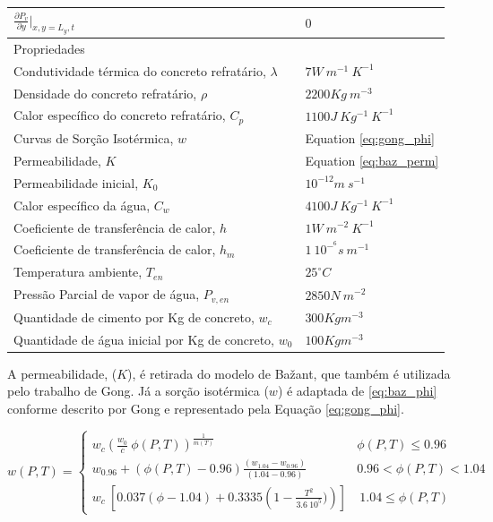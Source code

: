 \begin{table}[]
\begin{tabular}{|ll|}
$\frac{\partial P_v}{\partial y}\bigg\rvert_{x, y=L_y, t}$   & $0$                          \\ \hline
\multicolumn{2}{|l|}{Propriedades}                                                          \\ \hline
Condutividade térmica do concreto refratário, $\lambda$      & $7 W \ m^{-1} \ K^{-1}$      \\
Densidade do concreto refratário, $\rho$                     & $2200 Kg \ m^{-3}$           \\
Calor específico do concreto refratário, $C_p$               & $1100 J \ Kg^{-1} \ K^{-1}$  \\
Curvas de Sorção Isotérmica, $w$                             & Equation \ref{eq:gong_phi}           \\
Permeabilidade, $K$                                          & Equation \ref{eq:baz_perm}           \\
Permeabilidade inicial, $K_0$                                & $ 10^{-12} m \ s^{-1}$       \\
Calor específico da água, $C_w$                              & $ 4100 J \ Kg^{-1} \ K^{-1}$ \\
Coeficiente de transferência de calor, $h$                   & $ 1 W \ m^{-2} \ K^{-1}$     \\
Coeficiente de transferência de calor, $h_m$                 & $ 1 \ 10^{-^6} s \ m^{-1}$   \\
Temperatura ambiente, $T_{en}$                               & $ 25 ^{\circ}C$              \\
Pressão Parcial de vapor de água, $P_{v, en}$                & $ 2850 N \ m^{-2} $          \\
Quantidade de cimento por Kg de concreto, $w_c$              & $ 300 Kg m^{-3} $            \\
Quantidade de água inicial por Kg de concreto, $w_0$         & $ 100 Kg m^{-3} $            \\ \hline
\end{tabular}
\end{table}

    A permeabilidade, ($K$), é retirada do modelo de Bažant, que também é utilizada pelo
    trabalho de Gong. Já a sorção isotérmica ($w$) é adaptada de \ref{eq:baz_phi}
    conforme descrito por Gong e representado pela Equação \ref{eq:gong_phi}.

\begin{equation}
  \label{eq:gong_phi}
      w(P, T) =
      \begin{cases} 
      w_c \left( \frac{w_0}{c} \ \phi(P,T) \right)^{\frac{1}{m(T)}} & \phi(P, T)\leq 0.96 \\
      w_{0.96} + (\phi(P, T) - 0.96) \frac{(w_{1.04} - w_{0.96})}{(1.04-0.96)} & 0.96 < \phi(P, T) < 1.04 \\
 w_c \ \left[0.037 (\phi-1.04) + 0.3335 \left(1 - \frac{T^2}{3.6 \ 10^5}) \right) \right] & \ 1.04 \leq \phi(P, T)
      \end{cases}
\end{equation}

